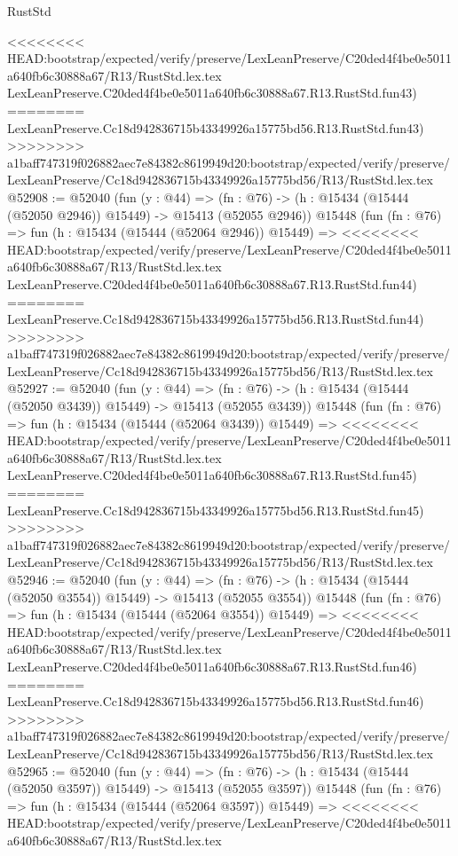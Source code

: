 \begin{lexlean}{RustStd}
\begin{coremodule}
{\begin{coremodule}
{{{{{{{{{{{{{{{{{{{{{{{{{{{{{{{{{{{{{{{{{{{{{{{{{{{{{{{{{{{{<<<<<<<< HEAD:bootstrap/expected/verify/preserve/LexLeanPreserve/C20ded4f4be0e5011a640fb6c30888a67/R13/RustStd.lex.tex
    LexLeanPreserve.C20ded4f4be0e5011a640fb6c30888a67.R13.RustStd.fun43)
========
    LexLeanPreserve.Cc18d942836715b43349926a15775bd56.R13.RustStd.fun43)
>>>>>>>> a1baff747319f026882aec7e84382c8619949d20:bootstrap/expected/verify/preserve/LexLeanPreserve/Cc18d942836715b43349926a15775bd56/R13/RustStd.lex.tex
@52908 := @52040
    (fun (y : @44) =>
    (fn : @76) -> (h : @15434 (@15444 (@52050 @2946)) @15449) -> @15413 (@52055 @2946))
    @15448
    (fun (fn : @76) =>
    fun (h : @15434 (@15444 (@52064 @2946)) @15449) =>
<<<<<<<< HEAD:bootstrap/expected/verify/preserve/LexLeanPreserve/C20ded4f4be0e5011a640fb6c30888a67/R13/RustStd.lex.tex
    LexLeanPreserve.C20ded4f4be0e5011a640fb6c30888a67.R13.RustStd.fun44)
========
    LexLeanPreserve.Cc18d942836715b43349926a15775bd56.R13.RustStd.fun44)
>>>>>>>> a1baff747319f026882aec7e84382c8619949d20:bootstrap/expected/verify/preserve/LexLeanPreserve/Cc18d942836715b43349926a15775bd56/R13/RustStd.lex.tex
@52927 := @52040
    (fun (y : @44) =>
    (fn : @76) -> (h : @15434 (@15444 (@52050 @3439)) @15449) -> @15413 (@52055 @3439))
    @15448
    (fun (fn : @76) =>
    fun (h : @15434 (@15444 (@52064 @3439)) @15449) =>
<<<<<<<< HEAD:bootstrap/expected/verify/preserve/LexLeanPreserve/C20ded4f4be0e5011a640fb6c30888a67/R13/RustStd.lex.tex
    LexLeanPreserve.C20ded4f4be0e5011a640fb6c30888a67.R13.RustStd.fun45)
========
    LexLeanPreserve.Cc18d942836715b43349926a15775bd56.R13.RustStd.fun45)
>>>>>>>> a1baff747319f026882aec7e84382c8619949d20:bootstrap/expected/verify/preserve/LexLeanPreserve/Cc18d942836715b43349926a15775bd56/R13/RustStd.lex.tex
@52946 := @52040
    (fun (y : @44) =>
    (fn : @76) -> (h : @15434 (@15444 (@52050 @3554)) @15449) -> @15413 (@52055 @3554))
    @15448
    (fun (fn : @76) =>
    fun (h : @15434 (@15444 (@52064 @3554)) @15449) =>
<<<<<<<< HEAD:bootstrap/expected/verify/preserve/LexLeanPreserve/C20ded4f4be0e5011a640fb6c30888a67/R13/RustStd.lex.tex
    LexLeanPreserve.C20ded4f4be0e5011a640fb6c30888a67.R13.RustStd.fun46)
========
    LexLeanPreserve.Cc18d942836715b43349926a15775bd56.R13.RustStd.fun46)
>>>>>>>> a1baff747319f026882aec7e84382c8619949d20:bootstrap/expected/verify/preserve/LexLeanPreserve/Cc18d942836715b43349926a15775bd56/R13/RustStd.lex.tex
@52965 := @52040
    (fun (y : @44) =>
    (fn : @76) -> (h : @15434 (@15444 (@52050 @3597)) @15449) -> @15413 (@52055 @3597))
    @15448
    (fun (fn : @76) =>
    fun (h : @15434 (@15444 (@52064 @3597)) @15449) =>
<<<<<<<< HEAD:bootstrap/expected/verify/preserve/LexLeanPreserve/C20ded4f4be0e5011a640fb6c30888a67/R13/RustStd.lex.tex
}}}}}}}}}}}}}}}}}}}}}}}}}}}}}}}}}}}}}}}}}}}}}}}}}}}}}}}}}}}}
\end{coremodule}}
\end{coremodule}
\end{lexlean}
